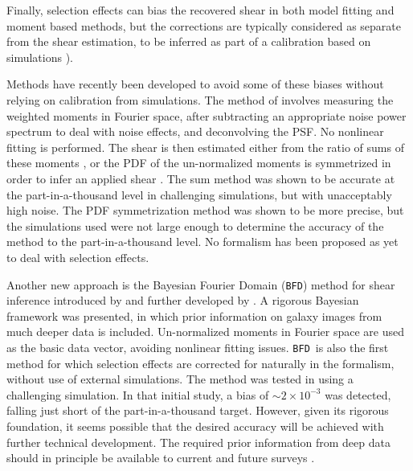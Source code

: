 \documentclass[iop, twocolappendix, appendixfloats, numberedappendix, apj]{emulateapj}
\newcommand{\bfd}{\texttt{BFD}}
\begin{document}
Finally, selection effects can bias the recovered shear in both model fitting
and moment based methods, but the corrections are typically considered as
separate from the shear estimation, to be inferred as part of a calibration
based on simulations \citep{Jarvis2016,KidsShear2017}).

Methods have recently been developed to avoid some of these biases without
relying on calibration from simulations.  The method of \cite{Zhang2017}
involves measuring the weighted moments in Fourier space, after subtracting an
appropriate noise power spectrum to deal with noise effects, and deconvolving
the PSF.  No nonlinear fitting is performed.  The shear is then estimated
either from the ratio of sums of these moments \citep{Zhang2015}, or the PDF of
the un-normalized moments is symmetrized in order to infer an applied shear
\citep{Zhang2017}.  The sum method was shown to be accurate at the
part-in-a-thousand level in challenging simulations, but with unacceptably high
noise.  The PDF symmetrization method was shown to be more precise, but the
simulations used were not large enough to determine the accuracy of the method
to the part-in-a-thousand level.  No formalism has been proposed as yet to deal
with selection effects. 

Another new approach is the Bayesian Fourier Domain (\bfd) method for shear
inference introduced by \cite{ba14} and further developed by \cite{bfd2016}.  A
rigorous Bayesian framework was presented, in which prior information on galaxy
images from much deeper data is included.  Un-normalized moments in
Fourier space are used as the basic data vector, avoiding nonlinear fitting
issues.  \bfd\ is also the first method for which selection effects are
corrected for naturally in the formalism, without use of external
simulations.  The method was tested in \cite{bfd2016} using a challenging
simulation.  In that initial study, a bias of $\sim 2 \times 10^{-3}$ was
detected, falling just short of the part-in-a-thousand target.  However, given
its rigorous foundation, it seems possible that the desired accuracy will be
achieved with further technical development.  The required prior information
from deep data should in principle be available to current and future surveys
\citep{DESWhitePaper,TakadaHSC2010,IvezicLSST08,Euclid2011,SpergelWFIRST2015}.


\end{document}

